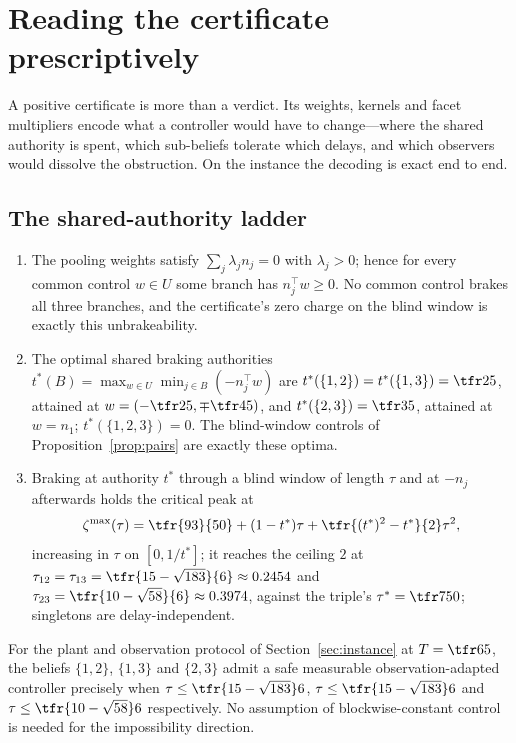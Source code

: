 \section{Reading the certificate prescriptively}\label{sec:ladder}

A positive certificate is more than a verdict. Its weights, kernels and facet multipliers encode what a controller would have to change---where the shared authority is spent, which sub-beliefs tolerate which delays, and which observers would dissolve the obstruction. On the instance the decoding is exact end to end.

\subsection{The shared-authority ladder}

\begin{proposition}\label{prop:ladder}
\begin{enumerate}[label=\textup{(\roman*)},leftmargin=2.2em,itemsep=1pt]
\item The pooling weights satisfy $\sum_j\lambda_jn_j=0$ with $\lambda_j>0$; hence for every common control $w\in U$ some branch has $n_j^\top w\ge0$. No common control brakes all three branches, and the certificate's zero charge on the blind window is exactly this unbrakeability.
\item The optimal shared braking authorities $t^\ast(B)=\max_{w\in U}\min_{j\in B}(-n_j^\top w)$ are $t^\ast(\{1,2\})=t^\ast(\{1,3\})=\tfr25$, attained at $w=(-\tfr25,\mp\tfr45)$, and $t^\ast(\{2,3\})=\tfr35$, attained at $w=n_1$; $t^\ast(\{1,2,3\})=0$. The blind-window controls of Proposition~\ref{prop:pairs} are exactly these optima.
\item Braking at authority $t^\ast$ through a blind window of length $\tau$ and at $-n_j$ afterwards holds the critical peak at
\[
\zeta^{\max}(\tau)=\tfr{93}{50}+(1-t^\ast)\tau+\tfr{(t^\ast)^2-t^\ast}{2}\tau^2 ,
\]
increasing in $\tau$ on $[0,1/t^\ast]$; it reaches the ceiling $2$ at $\tau_{12}=\tau_{13}=\tfr{15-\sqrt{183}}{6}\approx0.2454$ and $\tau_{23}=\tfr{10-\sqrt{58}}{6}\approx0.3974$, against the triple's $\tau^\ast=\tfr7{50}$; singletons are delay-independent.
\end{enumerate}
\end{proposition}

\begin{theorem}\label{thm:pairs}
For the plant and observation protocol of Section~\ref{sec:instance} at $T=\tfr65$, the beliefs $\{1,2\}$, $\{1,3\}$ and $\{2,3\}$ admit a safe measurable observation-adapted controller precisely when $\tau\le\tfr{15-\sqrt{183}}6$, $\tau\le\tfr{15-\sqrt{183}}6$ and $\tau\le\tfr{10-\sqrt{58}}6$ respectively. No assumption of blockwise-constant control is needed for the impossibility direction.
\end{theorem}

